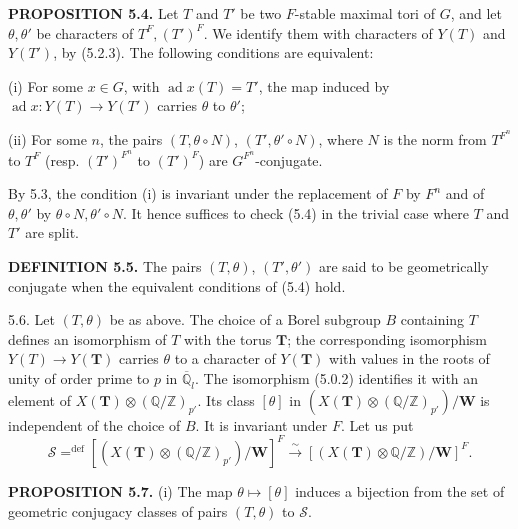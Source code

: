 \documentclass[9pt,twoside]{extarticle}
\begin{document}
{\noindent\textbf{PROPOSITION 5.4.} Let \(T\) and \(T'\) be two \(F\)-stable maximal tori of \(G\), and let \(\theta,\theta'\) be characters of \(T^F,(T')^F\). We identify them with characters of \(Y(T)\) and \(Y(T')\), by (5.2.3). The following conditions are equivalent:\par

(i) For some \(x\in G\), with \(\operatorname{ad}x(T)=T'\), the map induced by \(\operatorname{ad}x:Y(T)\to Y(T')\) carries \(\theta\) to \(\theta'\);\par

(ii) For some \(n\), the pairs \((T,\theta\circ N)\), \((T',\theta'\circ N)\), where \(N\) is the norm from \(T^{F^n}\) to \(T^F\) (resp. \((T')^{F^n}\) to \((T')^F\)) are \(G^{F^n}\)-conjugate.\par

By 5.3, the condition (i) is invariant under the replacement of \(F\) by \(F^n\) and of \(\theta,\theta'\) by \(\theta\circ N,\theta'\circ N\). It hence suffices to check (5.4) in the trivial case where \(T\) and \(T'\) are split.\par

\noindent\textbf{DEFINITION 5.5.} The pairs \((T,\theta)\), \((T',\theta')\) are said to be geometrically conjugate when the equivalent conditions of (5.4) hold.\par

5.6. Let \((T,\theta)\) be as above. The choice of a Borel subgroup \(B\) containing \(T\) defines an isomorphism of \(T\) with the torus \(\mathbf T\); the corresponding isomorphism \(Y(T)\to Y(\mathbf T)\) carries \(\theta\) to a character of \(Y(\mathbf T)\) with values in the roots of unity of order prime to \(p\) in \(\overline{\mathbb Q}_l\). The isomorphism (5.0.2) identifies it with an element of \(X(\mathbf T)\otimes(\mathbb Q/\mathbb Z)_{p'}\). Its class \([\theta]\) in \((X(\mathbf T)\otimes(\mathbb Q/\mathbb Z)_{p'})/\mathbf W\) is independent of the choice of \(B\). It is invariant under \(F\). Let us put \[
\mathcal S\mathrel{\mathop{=}^{\mathrm{def}}}
[(X(\mathbf T)\otimes(\mathbb Q/\mathbb Z)_{p'})/\mathbf W]^F
\xrightarrow{\sim}
[(X(\mathbf T)\otimes\mathbb Q/\mathbb Z)/\mathbf W]^F.
\]\par

\noindent\textbf{PROPOSITION 5.7.} (i) The map \(\theta\mapsto[\theta]\) induces a bijection from the set of geometric conjugacy classes of pairs \((T,\theta)\) to \(\mathcal S\).\par
}
\end{document}
